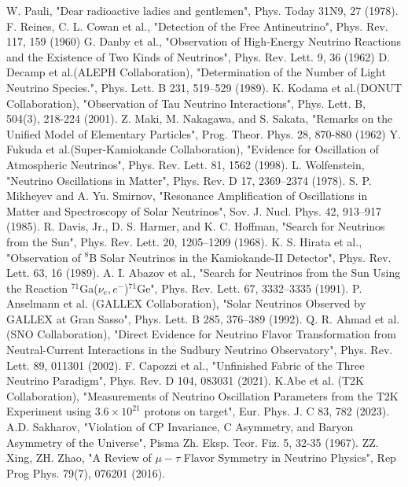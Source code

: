 \begin{thebibliography}{99}

 W. Pauli, "Dear radioactive ladies and gentlemen", Phys. Today 31N9, 27 (1978).
 F. Reines, C. L. Cowan et al., "Detection of the Free Antineutrino", Phys. Rev. 117, 159 (1960)
 G. Danby et al., "Observation of High-Energy Neutrino Reactions and the Existence of Two Kinds of Neutrinos", Phys. Rev. Lett. 9, 36 (1962)
 D. Decamp et al.(ALEPH Collaboration), "Determination of the Number of Light Neutrino Species.", Phys. Lett. B 231, 519–529 (1989).
 K. Kodama et al.(DONUT Collaboration), "Observation of Tau Neutrino Interactions", Phys. Lett.
B, 504(3), 218-224 (2001).
 Z. Maki, M. Nakagawa, and S. Sakata, "Remarks on the Unified Model of Elementary Particles", Prog. Theor. Phys. 28, 870-880 (1962)
 Y. Fukuda et al.(Super-Kamiokande Collaboration), "Evidence for Oscillation of Atmospheric Neutrinos", Phys. Rev. Lett. 81, 1562 (1998).
 L. Wolfenstein, "Neutrino Oscillations in Matter", Phys. Rev. D 17, 2369–2374 (1978).
 S. P. Mikheyev and A. Yu. Smirnov, "Resonance Amplification of Oscillations in Matter and Spectroscopy of Solar Neutrinos", Sov. J. Nucl. Phys. 42, 913–917 (1985).
 R. Davis, Jr., D. S. Harmer, and K. C. Hoffman, "Search for Neutrinos from the Sun", Phys. Rev. Lett. 20, 1205–1209 (1968).
 K. S. Hirata et al., "Observation of $^8$B Solar Neutrinos in the Kamiokande-II Detector", Phys. Rev. Lett. 63, 16 (1989).
  A. I. Abazov et al., "Search for Neutrinos from the Sun Using the Reaction $^{71}$Ga($\nu_e,e^{-}$)$^{71}$Ge", Phys. Rev. Lett. 67, 3332–3335 (1991).
 P. Anselmann et al. (GALLEX Collaboration), "Solar Neutrinos Observed by GALLEX at Gran Sasso", Phys. Lett. B 285, 376–389 (1992).
 Q. R. Ahmad et al. (SNO Collaboration), "Direct Evidence for Neutrino Flavor Transformation from Neutral-Current Interactions in the Sudbury Neutrino Observatory", Phys. Rev. Lett. 89, 011301 (2002).
 F. Capozzi et al., "Unfinished Fabric of the Three Neutrino Paradigm", Phys. Rev. D 104, 083031 (2021).
 K.Abe et al. (T2K Collaboration), "Measurements of Neutrino Oscillation Parameters from the T2K Experiment using $3.6\times10^{21}$ protons on target", Eur. Phys. J. C 83, 782 (2023).
 A.D. Sakharov, "Violation of CP Invariance, C Asymmetry, and Baryon Asymmetry of the Universe",
Pisma Zh. Eksp. Teor. Fiz. 5, 32-35 (1967).
 ZZ. Xing, ZH. Zhao, "A Review of $\mu-\tau$ Flavor Symmetry in Neutrino Physics", Rep Prog Phys. 79(7), 076201 (2016).


\end{thebibliography}
